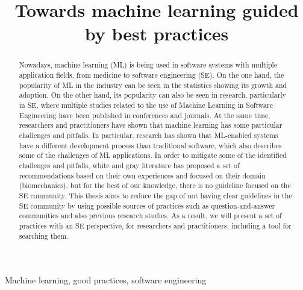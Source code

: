 \documentclass[10pt,conference]{IEEEtran}
\begin{document}
\title{Towards machine learning guided by best practices}

\author{

}

\maketitle

\begin{abstract}


Nowadays, machine learning (ML) is being used in software systems with multiple application fields, from medicine to software engineering (SE). On the one hand, the popularity of ML in the industry can be seen in the statistics showing its growth and adoption.  On the other hand, its popularity can also be seen in research, particularly  in SE, where multiple studies related to the use of Machine Learning in Software Engineering have been published in conferences and journals.  At the same time, researchers and practitioners have shown that machine learning has some particular challenges and pitfalls. In particular, research has shown that ML-enabled systems  have a different development process than traditional software, which also describes  some of the challenges of ML applications.  In order to mitigate some of the identified challenges and pitfalls, white and gray literature has proposed a set of recommendations based on their own experiences  and focused on their domain (\eg biomechanics), but for the best of our knowledge, there is no guideline focused on the SE community. %
This thesis aims to reduce the gap of not having clear guidelines in the SE community by using  possible sources of practices such as question-and-answer communities and also previous research studies. As a result, we will  present a set of practices with an SE perspective, for researchers and practitioners, including a tool for searching them. 

\end{abstract}

\begin{IEEEkeywords}
Machine learning, good practices, software engineering
\end{IEEEkeywords}










\balance


\end{document}
